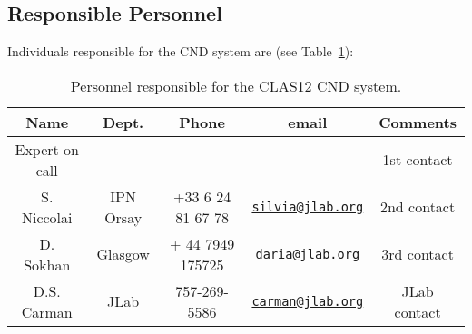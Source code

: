 \subsection{Responsible Personnel}

Individuals responsible for the CND system are (see Table~\ref{tb:cnd}):

\begin{table}[!htb]
\centering
\begin{tabular}{|c|c|c|c|c|} \hline
Name&Dept.&Phone&email&Comments \\ \hline
Expert on call& &&& 1st contact \\ \hline
S. Niccolai& IPN Orsay&+33 6 24 81 67 78&\href{mailto:silvia@jlab.org}{\nolinkurl{silvia@jlab.org}}& 2nd contact \\ \hline
D. Sokhan & Glasgow & + 44 7949 175725 &\href{mailto:daria@jlab.org}{\nolinkurl{daria@jlab.org}} & 3rd contact  \\ \hline
D.S. Carman & JLab & 757-269-5586 & \href{mailto:carman@jlab.org}{\nolinkurl{carman@jlab.org}} & JLab contact \\ \hline
\end{tabular}
\caption{Personnel responsible for the CLAS12 CND system.} 
\label{tb:cnd}
\end{table}
